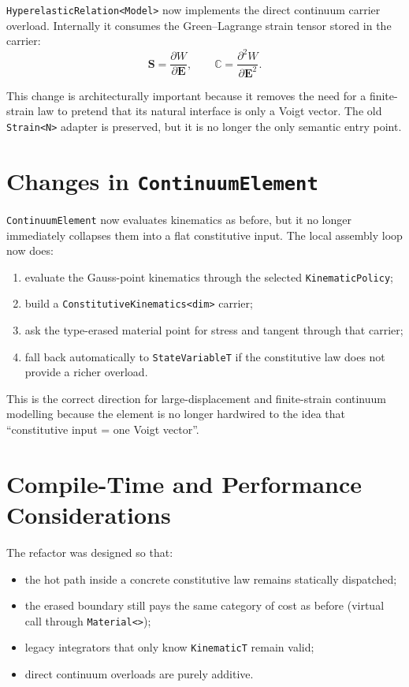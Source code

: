 \texttt{HyperelasticRelation<Model>} now implements the direct continuum
carrier overload. Internally it consumes the Green--Lagrange strain tensor
stored in the carrier:
\[
  \mathbf{S} = \frac{\partial W}{\partial \mathbf{E}}, \qquad
  \mathbb{C} = \frac{\partial^2 W}{\partial \mathbf{E}^2}.
\]

This change is architecturally important because it removes the need for a
finite-strain law to pretend that its natural interface is only a Voigt vector.
The old \texttt{Strain<N>} adapter is preserved, but it is no longer the only
semantic entry point.

\section{Changes in \texttt{ContinuumElement}}

\texttt{ContinuumElement} now evaluates kinematics as before, but it no longer
immediately collapses them into a flat constitutive input. The local assembly
loop now does:
\begin{enumerate}
  \item evaluate the Gauss-point kinematics through the selected
        \texttt{KinematicPolicy};
  \item build a \texttt{ConstitutiveKinematics<dim>} carrier;
  \item ask the type-erased material point for stress and tangent through that
        carrier;
  \item fall back automatically to \texttt{StateVariableT} if the constitutive
        law does not provide a richer overload.
\end{enumerate}

This is the correct direction for large-displacement and finite-strain
continuum modelling because the element is no longer hardwired to the idea that
``constitutive input = one Voigt vector''.

\section{Compile-Time and Performance Considerations}

The refactor was designed so that:
\begin{itemize}
  \item the hot path inside a concrete constitutive law remains statically
        dispatched;
  \item the erased boundary still pays the same category of cost as before
        (virtual call through \texttt{Material<>});
  \item legacy integrators that only know \texttt{KinematicT} remain valid;
  \item direct continuum overloads are purely additive.
\end{itemize}

